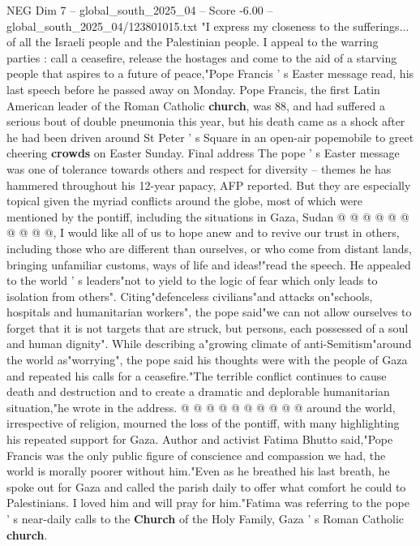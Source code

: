 \begin{textsample}{NEG Dim 7 – global\_south\_2025\_04 – Score -6.00 – global\_south\_2025\_04/123801015.txt}  \label{ex:f7_neg_305}
"I express my closeness to the sufferings... of all the Israeli people and the Palestinian people.
I appeal to the warring parties : call a ceasefire, release the hostages and come to the aid of a starving people that aspires to a future of peace,"Pope Francis ' s Easter message read, his last speech before he passed away on Monday.
Pope Francis, the first Latin American leader of the Roman Catholic \textbf{church}, was 88, and had suffered a serious bout of double pneumonia this year, but his death came as a shock after he had been driven around St Peter ' s Square in an open-air popemobile to greet cheering \textbf{crowds} on Easter Sunday.
Final address The pope ' s Easter message was one of tolerance towards others and respect for diversity -- themes he has hammered throughout his 12-year papacy, AFP reported.
But they are especially topical given the myriad conflicts around the globe, most of which were mentioned by the pontiff, including the situations in Gaza, Sudan @ @ @ @ @ @ @ @ @ @, I would like all of us to hope anew and to revive our trust in others, including those who are different than ourselves, or who come from distant lands, bringing unfamiliar customs, ways of life and ideas!"read the speech.
He appealed to the world ' s leaders"not to yield to the logic of fear which only leads to isolation from others".
Citing"defenceless civilians"and attacks on"schools, hospitals and humanitarian workers", the pope said"we can not allow ourselves to forget that it is not targets that are struck, but persons, each possessed of a soul and human dignity".
While describing a"growing climate of anti-Semitism"around the world as"worrying", the pope said his thoughts were with the people of Gaza and repeated his calls for a ceasefire."The terrible conflict continues to cause death and destruction and to create a dramatic and deplorable humanitarian situation,"he wrote in the address. @ @ @ @ @ @ @ @ @ @ around the world, irrespective of religion, mourned the loss of the pontiff, with many highlighting his repeated support for Gaza.
Author and activist Fatima Bhutto said,"Pope Francis was the only public figure of conscience and compassion we had, the world is morally poorer without him."Even as he breathed his last breath, he spoke out for Gaza and called the parish daily to offer what comfort he could to Palestinians.
I loved him and will pray for him."Fatima was referring to the pope ' s near-daily calls to the \textbf{Church} of the Holy Family, Gaza ' s Roman Catholic \textbf{church}.

\end{textsample}
